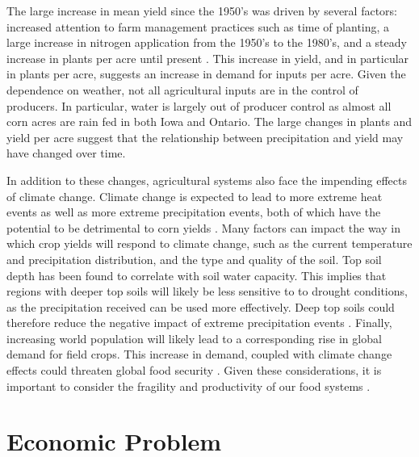 The large increase in mean yield since the 1950's was driven by several factors: increased attention to farm management practices such as time of planting, a large increase in nitrogen application from the 1950's to the 1980's, and a steady increase in plants per acre until present \citep{duvick2005contribution}. This increase in yield, and in particular in plants per acre, suggests an increase in demand for inputs per acre. Given the dependence on weather, not all agricultural inputs are in the control of producers. In particular, water is largely out of producer control as almost all corn acres are rain fed in both Iowa and Ontario. The large changes in plants and yield per acre suggest that the relationship between precipitation and yield may have changed over time. 

In addition to these changes, agricultural systems also face the impending effects of climate change. Climate change is expected to lead to more extreme heat events as well as more extreme precipitation events, both of which have the potential to be detrimental to corn yields \citep{rosenzweig2002increased,southworth2000consequences}. Many factors can impact the way in which crop yields will respond to climate change, such as the current temperature and precipitation distribution, and the type and quality of the soil. Top soil depth has been found to correlate with soil water capacity. This implies that regions with deeper top soils will likely be less sensitive to to drought conditions, as the precipitation received can be used more effectively. Deep top soils could therefore reduce the negative impact of extreme precipitation events \cite{lee2015topsoil}. Finally, increasing world population will likely lead to a corresponding rise in global demand for field crops. This increase in demand, coupled with climate change effects could threaten global food security \citep{edgerton2009increasing}. Given these considerations, it is important to consider the fragility and productivity of our food systems \citep{williams2016soil}.


\section{Economic Problem}

